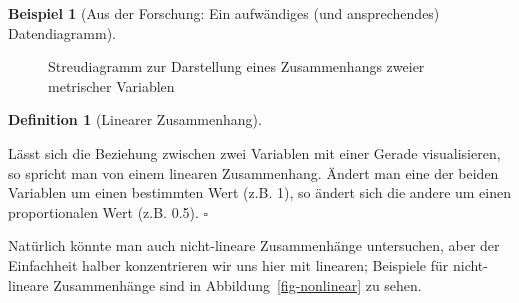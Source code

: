 \documentclass[
  a4paper,
]{scrbook}
\theoremstyle{definition}
\newtheorem{example}{Beispiel}[chapter]
\theoremstyle{definition}
\newtheorem{definition}{Definition}[chapter]
\theoremstyle{definition}
\theoremstyle{remark}
\begin{document}
\begin{example}[Aus der Forschung: Ein aufwändiges (und ansprechendes)
Datendiagramm]
\begin{figure}
\begin{minipage}{0.50\linewidth}
{}


\end{minipage}%
%
\begin{minipage}{0.50\linewidth}



\end{minipage}%

\caption{\label{fig-streu1}Streudiagramm zur Darstellung eines
Zusammenhangs zweier metrischer Variablen}

\end{figure}%

\begin{definition}[Linearer
Zusammenhang]\protect\hypertarget{def-lin-zshg}{}\label{def-lin-zshg}

Lässt sich die Beziehung zwischen zwei Variablen mit einer Gerade
visualisieren, so spricht man von einem linearen Zusammenhang. Ändert
man eine der beiden Variablen um einen bestimmten Wert (z.B. 1), so
ändert sich die andere um einen proportionalen Wert (z.B. 0.5).
\(\square\)

\end{definition}

Natürlich könnte man auch nicht-lineare Zusammenhänge untersuchen, aber
der Einfachheit halber konzentrieren wir uns hier mit linearen;
Beispiele für nicht-lineare Zusammenhänge sind in
Abbildung~\ref{fig-nonlinear} zu sehen.


\end{example}
\end{document}
